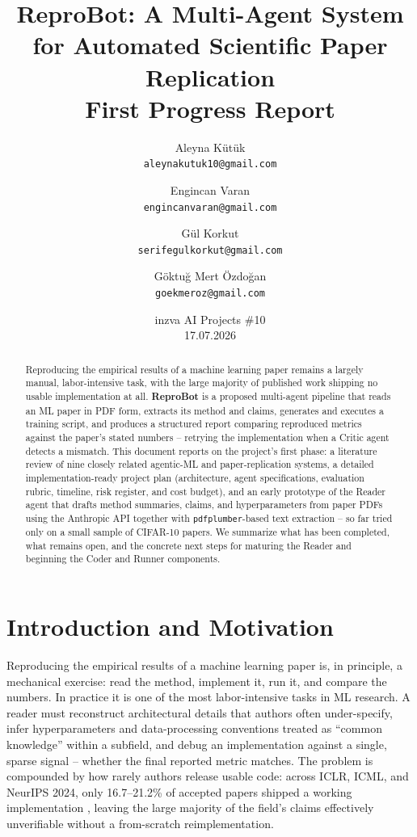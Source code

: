 \documentclass[10pt,twocolumn]{article}
\title{\textbf{ReproBot: A Multi-Agent System for Automated Scientific Paper Replication}\\[0.4em]
\large First Progress Report}
\author{
  Aleyna Kütük \\ \small\texttt{aleynakutuk10@gmail.com}
  \and
  Engincan Varan \\ \small\texttt{engincanvaran@gmail.com}
  \and
  Gül Korkut \\ \small\texttt{serifegulkorkut@gmail.com}
  \and
  Göktuğ Mert Özdoğan \\ \small\texttt{goekmeroz@gmail.com}
}
\date{inzva AI Projects \#10 \\ 17.07.2026}
\begin{document}
\maketitle

\begin{abstract}
Reproducing the empirical results of a machine learning paper remains a largely manual,
labor-intensive task, with the large majority of published work shipping no usable
implementation at all. \textbf{ReproBot} is a proposed multi-agent pipeline that reads
an ML paper in PDF form, extracts its method and claims, generates and executes a
training script, and produces a structured report comparing reproduced metrics against
the paper's stated numbers -- retrying the implementation when a Critic agent detects a
mismatch. This document reports on the project's first phase: a literature review of
nine closely related agentic-ML and paper-replication systems, a detailed
implementation-ready project plan (architecture, agent specifications, evaluation
rubric, timeline, risk register, and cost budget), and an early prototype of the Reader
agent that drafts method summaries, claims, and hyperparameters from paper PDFs using the
Anthropic API together with \texttt{pdfplumber}-based text extraction -- so far tried only
on a small sample of CIFAR-10 papers. We summarize what has been completed, what remains
open, and the concrete next steps for maturing the Reader and beginning the Coder and
Runner components.
\end{abstract}

\section{Introduction and Motivation}
\label{sec:intro}

Reproducing the empirical results of a machine learning paper is, in principle, a
mechanical exercise: read the method, implement it, run it, and compare the numbers.
In practice it is one of the most labor-intensive tasks in ML research. A reader must
reconstruct architectural details that authors often under-specify, infer
hyperparameters and data-processing conventions treated as ``common knowledge'' within a
subfield, and debug an implementation against a single, sparse signal -- whether the
final reported metric matches. The problem is compounded by how rarely authors release
usable code: across ICLR, ICML, and NeurIPS 2024, only 16.7--21.2\% of accepted papers
shipped a working implementation \cite{seo2025papercoder}, leaving the large majority of
the field's claims effectively unverifiable without a from-scratch reimplementation.
\end{document}
